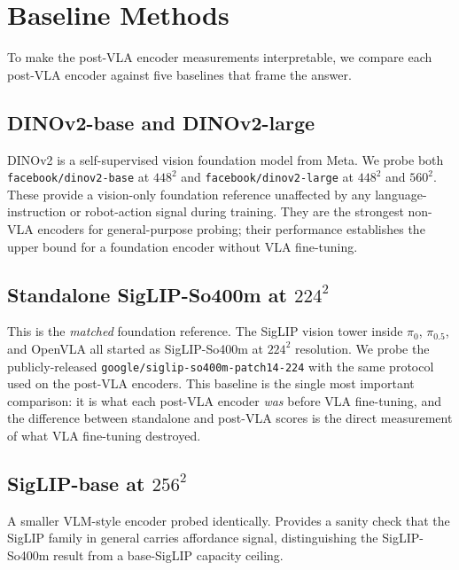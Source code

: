 \documentclass[11pt]{article}
\begin{document}
\section{Baseline Methods}
\label{sec:baselines}

To make the post-VLA encoder measurements interpretable, we compare each
post-VLA encoder against five baselines that frame the answer.

\subsection{DINOv2-base and DINOv2-large}

DINOv2 \cite{oquab2024dinov2} is a self-supervised vision foundation
model from Meta. We probe both \verb|facebook/dinov2-base| at $448^2$
and \verb|facebook/dinov2-large| at $448^2$ and $560^2$. These provide
a vision-only foundation reference unaffected by any
language-instruction or robot-action signal during training. They are
the strongest non-VLA encoders for general-purpose probing; their
performance establishes the upper bound for a foundation encoder
without VLA fine-tuning.

\subsection{Standalone SigLIP-So400m at $224^2$}

This is the \emph{matched} foundation reference. The SigLIP vision
tower inside $\pi_0$, $\pi_{0.5}$, and OpenVLA all started as
SigLIP-So400m at $224^2$ resolution. We probe the publicly-released
\verb|google/siglip-so400m-patch14-224| with the same protocol used on
the post-VLA encoders. This baseline is the single most important
comparison: it is what each post-VLA encoder \emph{was} before VLA
fine-tuning, and the difference between standalone and post-VLA scores
is the direct measurement of what VLA fine-tuning destroyed.

\subsection{SigLIP-base at $256^2$}

A smaller VLM-style encoder \cite{zhai2023sigmoid} probed identically.
Provides a sanity check that the SigLIP family in general carries
affordance signal, distinguishing the SigLIP-So400m result from a
base-SigLIP capacity ceiling.
\end{document}
